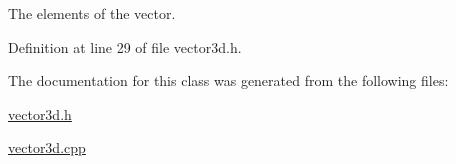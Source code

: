 The elements of the vector. 



Definition at line 29 of file vector3d.\-h.



The documentation for this class was generated from the following files\-:\begin{DoxyCompactItemize}
\item 
\hyperlink{vector3d_8h}{vector3d.\-h}\item 
\hyperlink{vector3d_8cpp}{vector3d.\-cpp}\end{DoxyCompactItemize}
